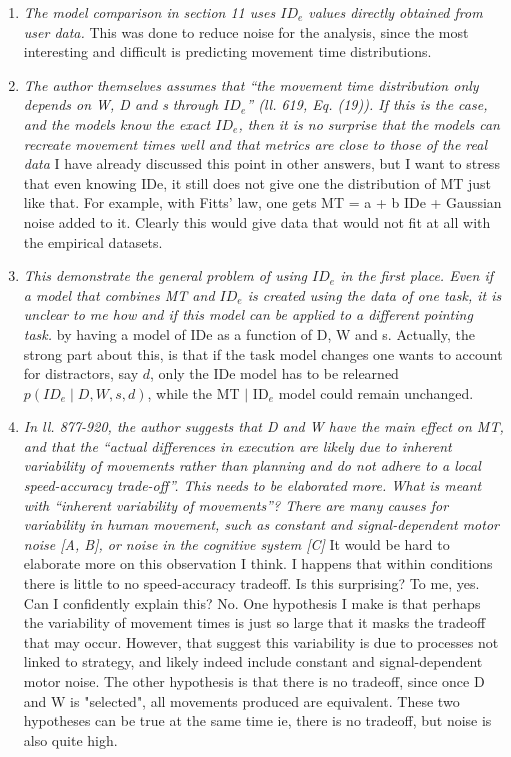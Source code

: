 \documentclass{article}
\begin{document}
\begin{enumerate}
    \item \textit{The model comparison in section 11 uses $ID_e$ values directly obtained from user data.} This was done to reduce noise for the analysis, since the most interesting and difficult is predicting movement time distributions. 
    \item \textit{The author themselves assumes that “the movement time distribution only depends on W, D and s through $ID_e$” (ll. 619, Eq. (19)). If this is the case, and the models know the exact $ID_e$, then it is no surprise that the models can recreate movement times well and that metrics are close to those of the real data} I have already discussed this point in other answers, but I want to stress that even knowing IDe, it still does not give one the distribution of MT just like that. For example, with Fitts' law, one gets MT = a + b IDe + Gaussian noise added to it. Clearly this would give data that would not fit at all with the empirical datasets.
    \item \textit{This demonstrate the general problem of using $ID_e$ in the first place. Even if a model that combines MT and $ID_e$ is created using the data of one task, it is unclear to me how and if this model can be applied to a different pointing task.} by having a model of IDe as a function of D, W and s. Actually, the strong part about this, is that if the task model changes \eg one wants to account for distractors, say $d$, only the IDe model has to be relearned $p(ID_e \mid D, W, s, d)$, while the MT $\mid$ ID$_e$ model could remain unchanged.
    \item \textit{In ll. 877-920, the author suggests that D and W have the main effect on MT, and that the “actual differences in execution are likely due to inherent variability of movements rather than planning and do not adhere to a local speed-accuracy trade-off”. This needs to be elaborated more. What is meant with “inherent variability of movements”? There are many causes for variability in human movement, such as constant and signal-dependent motor noise [A, B], or noise in the cognitive system [C]} It would be hard to elaborate more on this observation I think. I happens that within conditions there is little to no speed-accuracy tradeoff. Is this surprising? To me, yes. Can I confidently explain this? No. One hypothesis I make is that perhaps the variability of movement times is just so large that it masks the tradeoff that may occur. However, that suggest this variability is due to processes not linked to strategy, and likely indeed include constant and signal-dependent motor noise. The other hypothesis is that there is no tradeoff, since once D and W is "selected", all movements produced are equivalent. These two hypotheses can be true at the same time ie, there is no tradeoff, but noise is also quite high.

\end{enumerate}
\end{document}
